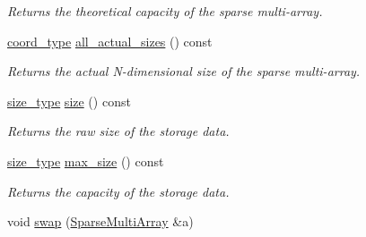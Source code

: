 \begin{DoxyCompactItemize}
\begin{DoxyCompactList}\small\item\em Returns the theoretical capacity of the sparse multi-\/array. \end{DoxyCompactList}\item 
\hypertarget{class_d_o_1_1_sparse_multi_array_a64a533cf4dbc0310557c4a0c06ecef6a}{\hyperlink{class_d_o_1_1_sparse_multi_array_ae4fb477425bbeb20329d300396ac2582}{coord\-\_\-type} \hyperlink{class_d_o_1_1_sparse_multi_array_a64a533cf4dbc0310557c4a0c06ecef6a}{all\-\_\-actual\-\_\-sizes} () const }\label{class_d_o_1_1_sparse_multi_array_a64a533cf4dbc0310557c4a0c06ecef6a}

\begin{DoxyCompactList}\small\item\em Returns the actual N-\/dimensional size of the sparse multi-\/array. \end{DoxyCompactList}\item 
\hypertarget{class_d_o_1_1_sparse_multi_array_a503ab01f6c0142145d3434f6924714e7}{\hyperlink{class_d_o_1_1_sparse_multi_array_ada51e68d31936547d3729c82daf6b7c6}{size\-\_\-type} \hyperlink{class_d_o_1_1_sparse_multi_array_a503ab01f6c0142145d3434f6924714e7}{size} () const }\label{class_d_o_1_1_sparse_multi_array_a503ab01f6c0142145d3434f6924714e7}

\begin{DoxyCompactList}\small\item\em Returns the raw size of the storage data. \end{DoxyCompactList}\item 
\hypertarget{class_d_o_1_1_sparse_multi_array_a0ab5ce862c0331d9e45a6e1774fca131}{\hyperlink{class_d_o_1_1_sparse_multi_array_ada51e68d31936547d3729c82daf6b7c6}{size\-\_\-type} \hyperlink{class_d_o_1_1_sparse_multi_array_a0ab5ce862c0331d9e45a6e1774fca131}{max\-\_\-size} () const }\label{class_d_o_1_1_sparse_multi_array_a0ab5ce862c0331d9e45a6e1774fca131}

\begin{DoxyCompactList}\small\item\em Returns the capacity of the storage data. \end{DoxyCompactList}\item 
\hypertarget{class_d_o_1_1_sparse_multi_array_a475e9bb3f587819030146ed9b36a4fdd}{void \hyperlink{class_d_o_1_1_sparse_multi_array_a475e9bb3f587819030146ed9b36a4fdd}{swap} (\hyperlink{class_d_o_1_1_sparse_multi_array}{Sparse\-Multi\-Array} \&a)}\label{class_d_o_1_1_sparse_multi_array_a475e9bb3f587819030146ed9b36a4fdd}


\end{DoxyCompactItemize}
